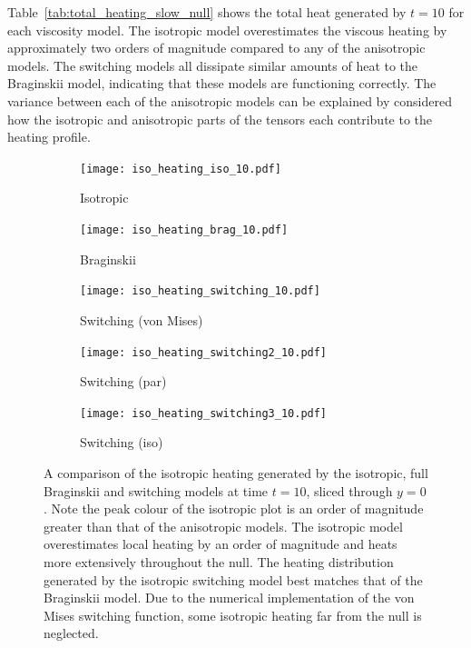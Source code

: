 Table~\ref{tab:total_heating_slow_null} shows the total heat generated by $t=10$ for each viscosity model. The isotropic model overestimates the viscous heating by approximately two orders of magnitude compared to any of the anisotropic models. The switching models all dissipate similar amounts of heat to the Braginskii model, indicating that these models are functioning correctly. The variance between each of the anisotropic models can be explained by considered how the isotropic and anisotropic parts of the tensors each contribute to the heating profile.

\begin{figure}[t]
    \centering
    \hfill
    \begin{subfigure}{0.32\textwidth}
      \texttt{[image: iso\_heating\_iso\_10.pdf]}
      \caption{Isotropic}%
      \label{fig:iso_heating_iso_10}
    \end{subfigure}
    \hfill
    \begin{subfigure}{0.32\textwidth}
      \texttt{[image: iso\_heating\_brag\_10.pdf]}
      \caption{Braginskii}%
      \label{fig:iso_heating_brag_10}
    \end{subfigure}
    \hfill
    \begin{subfigure}{0.32\textwidth}
      \texttt{[image: iso\_heating\_switching\_10.pdf]}
      \caption{Switching (von Mises)}%
      \label{fig:iso_heating_switching_10}
    \end{subfigure}
    \begin{subfigure}{0.32\textwidth}
      \texttt{[image: iso\_heating\_switching2\_10.pdf]}
      \caption{Switching (par)}%
      \label{fig:iso_heating_switching2_10}
    \end{subfigure}
    \begin{subfigure}{0.32\textwidth}
      \texttt{[image: iso\_heating\_switching3\_10.pdf]}
      \caption{Switching (iso)}%
      \label{fig:iso_heating_switching3_10}
    \end{subfigure}

    \caption{A comparison of the isotropic heating generated by the isotropic, full Braginskii and switching models at time $t=10$, sliced through $y=0$. Note the peak colour of the isotropic plot is an order of magnitude greater than that of the anisotropic models. The isotropic model overestimates local heating by an order of magnitude and heats more extensively throughout the null. The heating distribution generated by the isotropic switching model best matches that of the Braginskii model. Due to the numerical implementation of the von Mises switching function, some isotropic heating far from the null is neglected.}
\label{fig:isotropic_heating}%
\end{figure}

